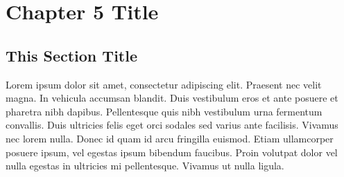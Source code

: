 \chapter{Chapter 5 Title}
\label{sec:chap5}
\thispagestyle{myheadings}

\section{This Section Title}
\label{sec:thissec}

Lorem ipsum dolor sit amet, consectetur adipiscing elit. Praesent nec velit magna. In vehicula accumsan blandit. Duis vestibulum eros et ante posuere et pharetra nibh dapibus. Pellentesque quis nibh vestibulum urna fermentum convallis. Duis ultricies felis eget orci sodales sed varius ante facilisis. Vivamus nec lorem nulla. Donec id quam id arcu fringilla euismod. Etiam ullamcorper posuere ipsum, vel egestas ipsum bibendum faucibus. Proin volutpat dolor vel nulla egestas in ultricies mi pellentesque. Vivamus ut nulla ligula. 

